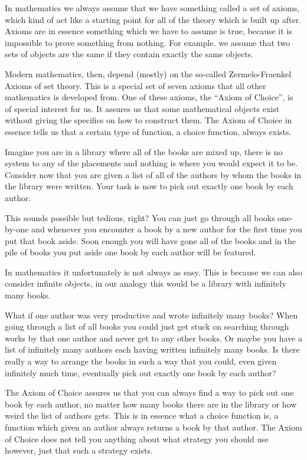 \documentclass[../../main.tex]{subfiles}
\begin{document}
In mathematics we always assume that we have something called a set of axioms, 
which kind of act like a starting point for all of the theory which is built up after.
Axioms are in essence something which we have to assume is true, because it is impossible to prove something from nothing.
For example. we assume that two sets of objects are the same if they contain exactly the same objects.

Modern mathematics, then, depend (mostly) on the so-called Zermelo-Fraenkel Axioms of set theory.
This is a special set of seven axioms that all other mathematics is developed from.
One of these axioms, the ``Axiom of Choice'', is of special interest for us.
It assures us that some mathematical objects exist without giving the specifics on how to construct them.
The Axiom of Choice in essence tells us that a certain type of function, a choice function, always exists.

Imagine you are in a library where all of the books are mixed up, there is no system to any of the placements and nothing is where you would expect it to be.
Consider now that you are given a list of all of the authors by whom the books in the library were written.
Your task is now to pick out exactly one book by each author.

This sounds possible but tedious, right? 
You can just go through all books one-by-one and whenever you encounter a book by a new author for the first time you put that book aside.
Soon enough you will have gone all of the books and in the pile of books you put aside one book by each author will be featured.

In mathematics it unfortunately is not always as easy.
This is because we can also consider infinite objects, in our analogy this would be a library with infinitely many books.

What if one author was very productive and wrote infinitely many books?
When going through a list of all books you could just get stuck on searching through works by that one author and never get to any other books.
Or maybe you have a list of infinitely many authors each having written infinitely many books.
Is there really a way to arrange the books in such a way that you could, even given infinitely much time, eventually pick out exactly one book by each author?

The Axiom of Choice assures us that you can always find a way to pick out one book by each author, 
no matter how many books there are in the library or how weird the list of authors gets.
This is in essence what a choice function is, a function which given an author always returns a book by that author.
The Axiom of Choice does not tell you anything about what strategy you should use however, just that such a strategy exists.
\end{document}

